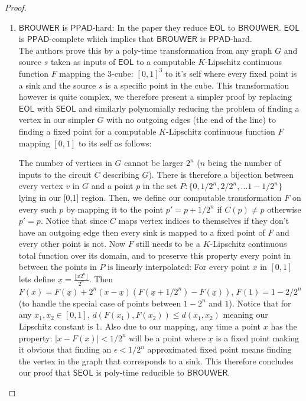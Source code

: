 \documentclass[11pt]{article}
\newcommand{\PPAD}{\mathsf{PPAD}}
\newcommand{\PPADc}{\mathsf{PPAD}\text{-complete}}
\newcommand{\eol}{\mathsf{EOL}}
\newcommand{\seol}{\mathsf{SEOL}}
\begin{document}
\begin{proof}
\begin{enumerate}
        \item $\mathsf{BROUWER}$ is $\PPAD$-hard: In the paper they reduce $\eol$ to $\mathsf{BROUWER}$. $\eol$ is $\PPADc$ which implies that $\mathsf{BROUWER}$ is $\PPAD$-hard.\\
            The authors prove this by a poly-time transformation from any graph $G$ and source $s$ taken as inputs of $\eol$ to a computable $K$-Lipschitz continuous function $F$ mapping the 3-cube: $[0,1]^3$ to it's self where every fixed point is a sink and the source $s$ is a specific point in the cube. This transformation however is quite complex, we therefore present a simpler proof by replacing $\eol$ with $\seol$ and similarly polynomially reducing the problem of finding a vertex in our simpler $G$ with no outgoing edges (the end of the line) to finding a fixed point for a computable $K$-Lipschitz continuous function $F$ mapping $[0,1]$ to its self as follows:
            
                The number of vertices in $G$ cannot be larger $2^n$ ($n$ being the number of inputs to the circuit $C$ describing $G$). There is therefore a bijection between every vertex $v$ in $G$ and a point $p$ in the set $P: \{0,1/2^n, 2/2^n, \dots 1-1/2^n\}$ lying in our [0,1] region. Then, we define our computable transformation $F$ on every such $p$ by mapping it to the point $p' = p + 1/2^n$ if $C(p) \not = p$ otherwise $p' = p$. Notice that since $C$ maps vertex indices to themselves if they don't have an outgoing edge then every sink is mapped to a fixed point of $F$ and every other point is not. Now $F$ still needs to be a $K$-Lipschitz continuous total function over its domain, and to preserve this property every point in between the points in $P$ is linearly interpolated: For every point $x$ in $[0,1]$ lets define $\underline{x} = \frac{\lfloor x2^n \rfloor}{2^n}$. Then $F(x) = F(\underline{x}) + 2^n(x - \underline{x})(F(\underline{x} + 1/2^n) - F(\underline{x}))$, $F(1) = 1-2/2^n$ (to handle the special case of points between $1-2^n$ and $1$). Notice that for any $x_1, x_2 \in [0,1]$, $d(F(x_1), F(x_2)) \leq d(x_1, x_2)$ meaning our Lipschitz constant is 1. Also due to our mapping, any time a point $x$ has the property: $|x - F(x)| < 1/2^n$ will be a point where $\underline{x}$ is a fixed point making it obvious that finding an $\epsilon < 1/2^n$ approximated fixed point means finding the vertex in the graph that corresponds to a sink. This therefore concludes our proof that $\seol$ is poly-time reducible to $\mathsf{BROUWER}$.
    \end{enumerate}
    

\end{proof}
\end{document}
